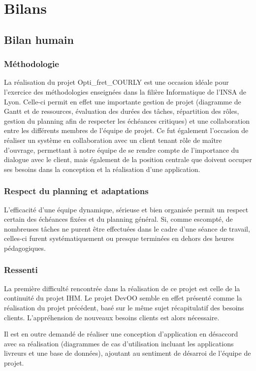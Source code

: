 \chapter{Bilans}
\section{Bilan humain}
\subsection{Méthodologie}
La réalisation du projet Opti\_fret\_COURLY est une occasion idéale pour l’exercice des méthodologies enseignées dans la filière Informatique de l’INSA de Lyon. Celle-ci permit en effet une importante gestion de projet (diagramme de Gantt et de ressources, évaluation des durées des tâches, répartition des rôles, gestion du planning afin de respecter les échéances critiques) et une collaboration entre les différents membres de l’équipe de projet. Ce fut également l’occasion de réaliser un système en collaboration avec un client tenant rôle de maître d’ouvrage, permettant à notre équipe de se rendre compte de l’importance du dialogue avec le client, mais également de la position centrale que doivent occuper ses besoins dans la conception et la réalisation d’une application.

\subsection{Respect du planning et adaptations}
L’efficacité d’une équipe dynamique, sérieuse et bien organisée permit un respect certain des échéances fixées et du planning général. Si, comme escompté, de nombreuses tâches ne purent être effectuées dans le cadre d’une séance de travail, celles-ci furent systématiquement ou presque terminées en dehors des heures pédagogiques.

\subsection{Ressenti}
La première difficulté rencontrée dans la réalisation de ce projet est celle de la continuité du projet IHM. Le projet DevOO semble en effet présenté comme la réalisation du projet précédent, basé sur le même sujet récapitulatif des besoins clients. L'appréhension de nouveaux besoins clients est alors nécessaire.

Il est en outre demandé de réaliser une conception d'application en désaccord avec sa réalisation (diagrammes de cas d'utilisation incluant les applications livreurs et une base de données), ajoutant au sentiment de désarroi de l'équipe de projet.

